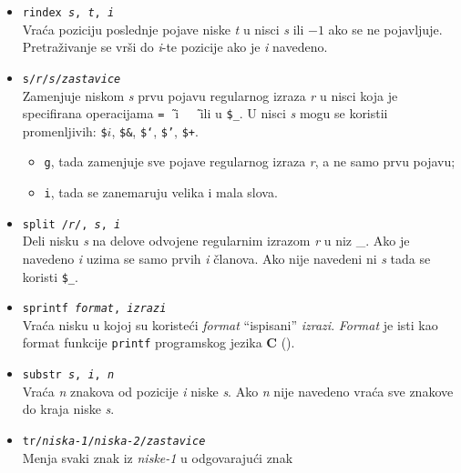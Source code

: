 \documentclass[12pt,a4paper]{article}
\begin{document}
\begin{itemize}
          Ina\v ce nije neophodno navesti poziv funkcije {\tt m} ve\'c je
          dovoljno samo navesti {\tt/{\it r}/}.
        \item
          {\tt rindex {\it s}, {\it t}, {\it i}}\\
          Vra\'ca poziciju poslednje pojave niske {\it t} u nisci {\it s} ili
          $-1$ ako se ne pojavljuje.
          Pretra\v zivanje se vr\v si do {\it i}-te pozicije ako je {\it i}
          navedeno.
        \item
          {\tt s/{\it r}/{\it s}/{\it zastavice}}\\
          Zamenjuje niskom {\it s} prvu pojavu regularnog izraza {\it r} u
          nisci koja je specifirana operacijama {\tt=\~\ } i {\tt~\~\ } ili u
          {\tt\$\_}.
          U nisci {\it s} mogu se koristii promenljivih: {\tt\$$i$},
          {\tt\$\&}, {\tt\$`}, {\tt\$'}, {\tt\$+}.
          \begin{itemize}
          \item
            {\tt g}, tada zamenjuje sve pojave regularnog izraza {\it r}, a ne
            samo prvu pojavu;
          \item
            {\tt i}, tada se zanemaruju velika i mala slova.
          \end{itemize}
        \item
          {\tt split /{\it r}/, {\it s}, {\it i}}\\
          Deli nisku {\it s} na delove odvojene regularnim izrazom {\it r} u
          niz {\tt@\_}.
          Ako je navedeno {\it i} uzima se samo prvih {\it i} \v clanova.
          Ako nije navedeni ni {\it s} tada se koristi {\tt\$\_}.
        \item
          {\tt sprintf {\it format}, {\it izrazi}}\\
          Vra\'ca nisku u kojoj su koriste\'ci {\it format} ``ispisani''
          {\it izrazi}.
          {\it Format} je isti kao format funkcije {\tt printf} programskog
          jezika {\bf C} (\cite{KR,PERL}).
        \item
          {\tt substr {\it s}, {\it i}, {\it n}}\\
          Vra\'ca {\it n} znakova od pozicije {\it i} niske {\it s}.
          Ako {\it n} nije navedeno vra\'ca sve znakove do kraja niske
          {\it s}.
        \item
          {\tt tr/{\it niska-1}/{\it niska-2}/{\it zastavice}}\\
          Menja svaki znak iz {\it niske-1} u odgovaraju\'ci znak

\end{itemize}
\end{document}
